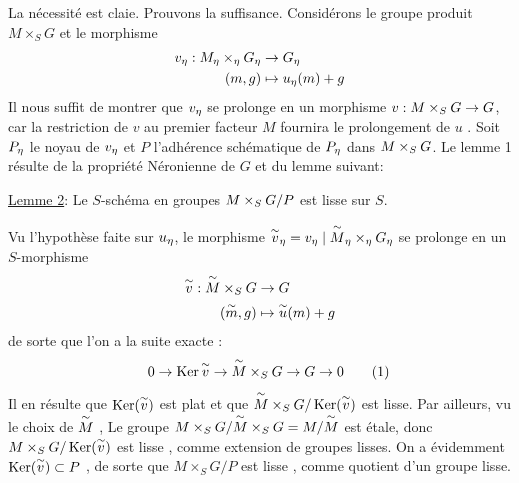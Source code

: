 La nécessité est claie. Prouvons la suffisance. Considérons le groupe
produit $M\times_S G$ et le morphisme
\[
\begin{aligned}
v_{\eta}:M_{\eta}\times_{\eta}G_{\eta}&\to G_{\eta}\\
(m,g)&\mapsto u_{\eta}(m)+g
\end{aligned}
\]
Il nous suffit de montrer que $v_{\eta}$ se prolonge en un morphisme $v:M\times_S G\to G$,
car la restriction de $v$ au premier facteur $M$ fournira le prolongement
de $u$ . Soit $P_{\eta}$ le noyau de $v_{\eta}$ et $P$ l'adhérence schématique de $P_{\eta}$ dans
$M\times_S G$. Le lemme 1 résulte de la propriété Néronienne de $G$ et du lemme suivant:

\uline{Lemme 2}: Le $S$-schéma en groupes $M\times_S G/P$  est lisse sur $S$.

Vu l'hypothèse faite sur $u_{\eta}$, le morphisme $\overset{\sim}{v}_{\eta}=v_{\eta}\mid\overset{\sim}{M}_{\eta}\times_{\eta}G_{\eta}$ se prolonge en un $S$-morphisme
\[
\begin{aligned}
\overset{\sim}{v}:\overset{\sim}{M}\times_S G&\to G\\
(\overset{\sim}{m},g)&\mapsto \overset{\sim}{u}(m)+g
\end{aligned}
\]
de sorte que l'on a la suite exacte :
\[
0\handwritten{\to}\operatorname{Ker}\overset{\handwritten{\sim}}{v}\handwritten{\to}\overset{\handwritten{\sim}}{M}\handwritten{\times}_S G\handwritten{\to} G\handwritten{\to}0 \tag*{\makebox[0pt][r]{\makebox[\displaywidth][l]{(1)}}}
\]
\margin{\handwritten{$\checkmark$}}
Il en résulte que $\operatorname{Ker}(\overset{\sim}{v})$ est plat  et que $\overset{\sim}{M}\times_S G/\operatorname{Ker}(\overset{\sim}{v})$ est lisse. Par
ailleurs, vu le choix de $\overset{\sim}{M}$ , Le groupe $M\times_S G/\overset{\sim}{M}\times_S G=M/\overset{\sim}{M}$ est étale, donc
$M\times_S G/\operatorname{Ker}(\overset{\sim}{v})$ est lisse , comme extension de groupes lisses. On a évidemment
$\operatorname{Ker}(\overset{\sim}{v})\subset P$ , de sorte que $M\times_S G/P$ est  lisse , comme quotient d'un groupe
lisse.

